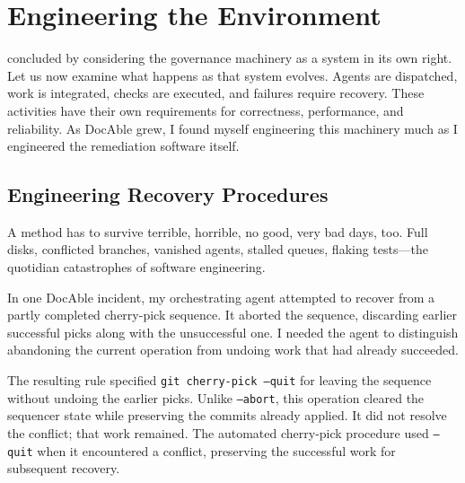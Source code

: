 


\chapter{Engineering the Environment}

 concluded by considering the governance machinery as a system in its own right. Let us now examine what happens as that system evolves. Agents are dispatched, work is integrated, checks are executed, and failures require recovery. These activities have their own requirements for correctness, performance, and reliability. As DocAble grew, I found myself engineering this machinery much as I engineered the remediation software itself.

\section{Engineering Recovery Procedures}\label{heading:lifecycle-models-and-recovery}

A method has to survive terrible, horrible, no good, very bad days, too. Full disks, conflicted branches, vanished agents, stalled queues, flaking tests---the quotidian catastrophes of software engineering.

In one DocAble incident, my orchestrating agent attempted to recover from a partly completed cherry-pick sequence. It aborted the sequence, discarding earlier successful picks along with the unsuccessful one. I needed the agent to distinguish abandoning the current operation from undoing work that had already succeeded.

The resulting rule specified \texttt{git cherry-pick --quit} for leaving the sequence without undoing the earlier picks. Unlike \texttt{--abort}, this operation cleared the sequencer state while preserving the commits already applied. It did not resolve the conflict; that work remained. The automated cherry-pick procedure used \texttt{--quit} when it encountered a conflict, preserving the successful work for subsequent recovery.

